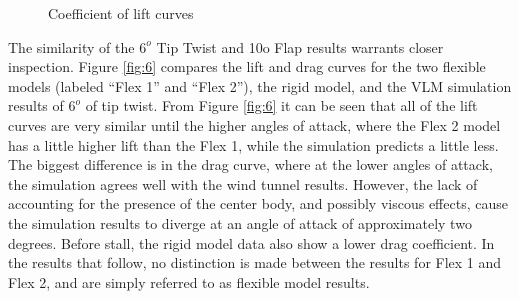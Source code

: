 \documentclass[11pt]{ucthesis}
\begin{document}
\begin{figure}[thpb]
\hfill
{}
\hfill
{}
\hfill
\caption{Coefficient of lift curves}
\label{fig:CL}
\end{figure}

The similarity of the $6^o$ Tip Twist and 10o Flap results warrants closer inspection. Figure \ref{fig:6} compares the lift and drag curves for the two flexible models (labeled “Flex 1” and “Flex 2”), the rigid model, and the VLM simulation results of $6^o$ of tip twist. From Figure \ref{fig:6} it can be seen that all of the lift curves are very similar until the higher angles of attack, where the Flex 2 model has a little higher lift than the Flex 1, while the simulation predicts a little less. The biggest difference is in the drag curve, where at the lower angles of attack, the simulation agrees well with the wind tunnel results. However, the lack of accounting for the presence of the center body, and possibly viscous effects, cause the simulation results to diverge at an angle of attack of approximately two degrees. Before stall, the rigid model data also show a lower drag coefficient.  In the results that follow, no distinction is made between the results for Flex 1 and Flex 2, and are simply referred to as flexible model results.
\end{document}
